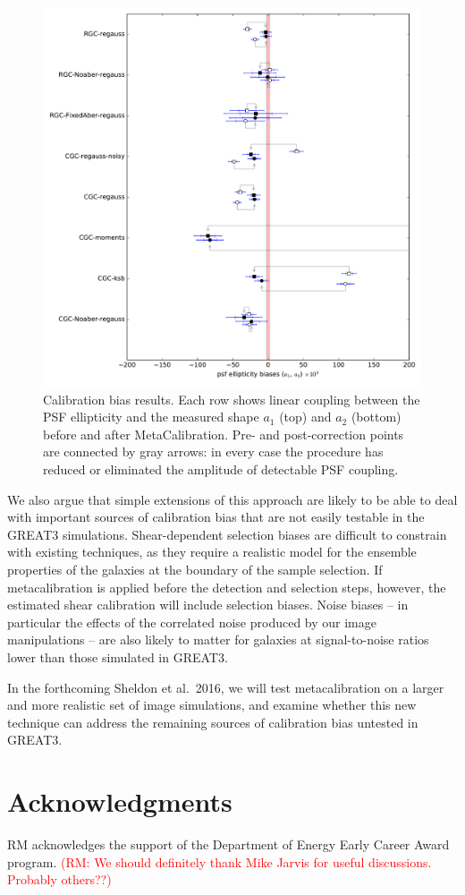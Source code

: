 \documentclass[iop]{emulateapj}
\newcommand\rmcomment[1]{\textcolor{red}{(RM: #1)}}
\begin{document}
\begin{figure}[t]
\begin{center}
\includegraphics[width=0.8\linewidth]{./Plots/a_results_linear.pdf}
\end{center}
\caption{Calibration bias results. Each row shows linear coupling
  between the PSF ellipticity and the measured shape $a_1$ (top) and
  $a_2$ (bottom) before and after MetaCalibration. Pre- and
  post-correction points are connected by gray arrows: in every case
  the procedure has reduced or eliminated the amplitude of detectable
  PSF coupling.}
\end{figure}



We also argue that simple extensions of this approach are likely to be
able to deal with important sources of calibration bias that are not
easily testable in the GREAT3 simulations. Shear-dependent selection
biases are difficult to constrain with existing techniques, as they
require a realistic model for the ensemble properties of the galaxies
at the boundary of the sample selection. If metacalibration is applied
before the detection and selection steps, however, the estimated shear
calibration will include selection biases. Noise biases -- in
particular the effects of the correlated noise produced by our image
manipulations -- are also likely to matter for galaxies at
signal-to-noise ratios lower than those simulated in GREAT3.

In the forthcoming Sheldon et al.\ 2016, we will test metacalibration
on a larger and more realistic set of image simulations, and examine
whether this new technique can address the remaining sources of
calibration bias untested in GREAT3.




\section*{Acknowledgments}

RM acknowledges the support of the
Department of Energy Early Career Award program.
\rmcomment{We should definitely thank Mike Jarvis for useful discussions.  Probably others??}



\end{document}
